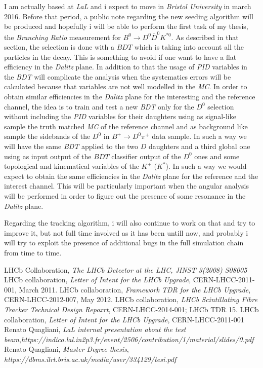 \documentclass[paper=a4, fontsize=10pt]{scrartcl}
\numberwithin{equation}{section}		%
\numberwithin{figure}{section}			%
\numberwithin{table}{section}				%
\begin{document}
I am actually based at \textit{LaL} and i expect to move in \textit{Bristol University} in march 2016. Before that period, a public note regarding the new seeding algorithm will be produced and hopefully i will be able to perform the first task of my thesis, the \textit{Branching Ratio} measurement for $B^{0}\rightarrow D^{0}\overline{D}^{0}K^{\ast 0}$. As described in that section, the selection is done with a $BDT$ which is taking into account all the particles in the decay. This is something to avoid if one want to have a flat efficiency in the \textit{Dalitz} plane. In addition to that the usage of \textit{PID} variables in the \textit{BDT} will complicate the analysis when the systematics errors will be calculated because that variables are not well modelled in the \textit{MC}. In order to obtain similar efficiencies in the \textit{Dalitz} plane for the interesting and the reference channel, the idea is to train and test a new \textit{BDT} only for the $D^{0}$ selection without including the \textit{PID} variables for their daughters using as signal-like sample the truth matched \textit{MC} of the reference channel and as background like sample the sidebands of the $D^{0}$ in  $B^{+}\rightarrow D^{0} \pi^{+}$ data sample. In such a way we will have the same \textit{BDT} applied to the two $D$ daughters and a third global one using as input output of the $BDT$ classifier output of the $D^{0}$ ones and some topological and kinematical variables of the $K^{+}$ ($K^{\ast}$). In such a way we would expect to obtain the same efficiencies in the \textit{Dalitz} plane for the reference and the interest channel. This will be particularly important when the angular analysis will be performed in order to figure out the presence of some resonance in the \textit{Dalitz} plane.

Regarding the tracking algorithm, i will also continue to work on that and try to improve it, but not full time involved as it has been untill now, and probably i will try to exploit the presence of additional bugs in the full simulation chain from time to time.



\begin{thebibliography}{100}
 LHCb Collaboration, \textit{The LHCb Detector at the LHC, JINST 3(2008) S08005}
 LHCb collaboration, \textit{Letter of Intent for the LHCb Upgrade}, CERN-LHCC-2011-001, March 2011.
 LHCb collaboration, \textit{Framework TDR for the LHCb Upgrade}, CERN-LHCC-2012-007, May 2012.
 LHCb collaboration, \textit{LHCb Scintillating Fibre Tracker Technical Design Repoxrt}, CERN-LHCC-2014-001; LHCb TDR 15.
 LHCb collaboration, \textit{Letter of Intent for the LHCb Upgrade}, CERN-LHCC-2011-001
 Renato Quagliani, \textit{LaL internal presentation about the test beam},\emph{https://indico.lal.in2p3.fr/event/2506/contribution/1/material/slides/0.pdf}
 Renato Quagliani, \textit{Master Degree thesis}, \emph{https://dbms.ilrt.bris.ac.uk/media/user/334129/tesi.pdf}

\end{thebibliography}
\end{document}
